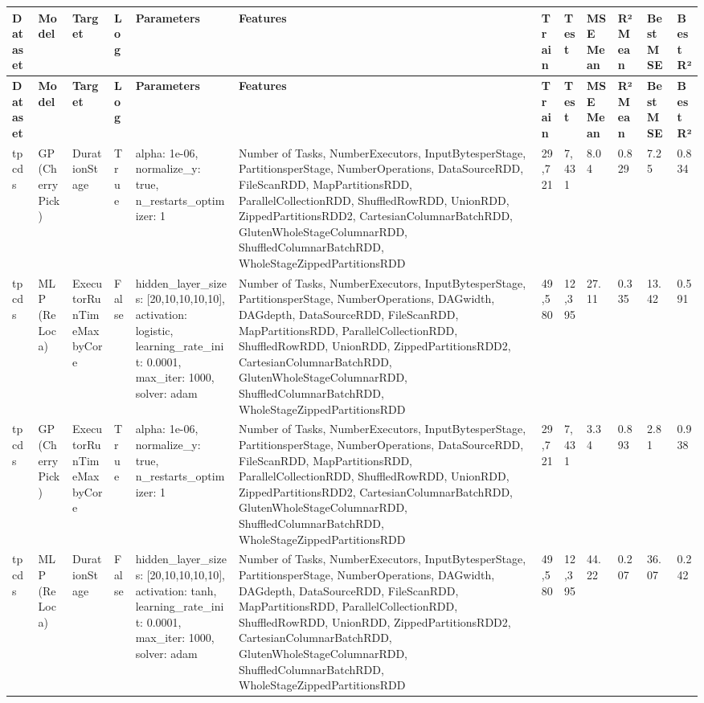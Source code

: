 \begin{landscape}
\begin{longtable}{@{}p{1.5cm}p{2cm}p{2.5cm}p{1cm}p{4cm}p{6cm}p{1.5cm}p{1.5cm}p{1.5cm}p{1.5cm}p{1.5cm}p{1.5cm}@{}}
\toprule
\textbf{Dataset} & \textbf{Model} & \textbf{Target} & \textbf{Log} & \textbf{Parameters} & \textbf{Features} & \textbf{Train} & \textbf{Test} & \textbf{MSE Mean} & \textbf{R² Mean} & \textbf{Best MSE} & \textbf{Best R²} \\
\midrule
\endfirsthead
\toprule
\textbf{Dataset} & \textbf{Model} & \textbf{Target} & \textbf{Log} & \textbf{Parameters} & \textbf{Features} & \textbf{Train} & \textbf{Test} & \textbf{MSE Mean} & \textbf{R² Mean} & \textbf{Best MSE} & \textbf{Best R²} \\
\midrule
\endhead
tpcds & GP (CherryPick) & DurationStage & True & alpha: 1e-06, normalize\_y: true, n\_restarts\_optimizer: 1 & Number of Tasks, NumberExecutors, InputBytesperStage, PartitionsperStage, NumberOperations, DataSourceRDD, FileScanRDD, MapPartitionsRDD, ParallelCollectionRDD, ShuffledRowRDD, UnionRDD, ZippedPartitionsRDD2, CartesianColumnarBatchRDD, GlutenWholeStageColumnarRDD, ShuffledColumnarBatchRDD, WholeStageZippedPartitionsRDD & 29,721 & 7,431 & 8.04 & 0.829 & 7.25 & 0.834 \\
\addlinespace
tpcds & MLP (ReLoca) & ExecutorRunTimeMaxbyCore & False & hidden\_layer\_sizes: [20,10,10,10,10], activation: logistic, learning\_rate\_init: 0.0001, max\_iter: 1000, solver: adam & Number of Tasks, NumberExecutors, InputBytesperStage, PartitionsperStage, NumberOperations, DAGwidth, DAGdepth, DataSourceRDD, FileScanRDD, MapPartitionsRDD, ParallelCollectionRDD, ShuffledRowRDD, UnionRDD, ZippedPartitionsRDD2, CartesianColumnarBatchRDD, GlutenWholeStageColumnarRDD, ShuffledColumnarBatchRDD, WholeStageZippedPartitionsRDD & 49,580 & 12,395 & 27.11 & 0.335 & 13.42 & 0.591 \\
\addlinespace
tpcds & GP (CherryPick) & ExecutorRunTimeMaxbyCore & True & alpha: 1e-06, normalize\_y: true, n\_restarts\_optimizer: 1 & Number of Tasks, NumberExecutors, InputBytesperStage, PartitionsperStage, NumberOperations, DataSourceRDD, FileScanRDD, MapPartitionsRDD, ParallelCollectionRDD, ShuffledRowRDD, UnionRDD, ZippedPartitionsRDD2, CartesianColumnarBatchRDD, GlutenWholeStageColumnarRDD, ShuffledColumnarBatchRDD, WholeStageZippedPartitionsRDD & 29,721 & 7,431 & 3.34 & 0.893 & 2.81 & 0.938 \\
\addlinespace
tpcds & MLP (ReLoca) & DurationStage & False & hidden\_layer\_sizes: [20,10,10,10,10], activation: tanh, learning\_rate\_init: 0.0001, max\_iter: 1000, solver: adam & Number of Tasks, NumberExecutors, InputBytesperStage, PartitionsperStage, NumberOperations, DAGwidth, DAGdepth, DataSourceRDD, FileScanRDD, MapPartitionsRDD, ParallelCollectionRDD, ShuffledRowRDD, UnionRDD, ZippedPartitionsRDD2, CartesianColumnarBatchRDD, GlutenWholeStageColumnarRDD, ShuffledColumnarBatchRDD, WholeStageZippedPartitionsRDD & 49,580 & 12,395 & 44.22 & 0.207 & 36.07 & 0.242 \\

\end{longtable}
\end{landscape}
